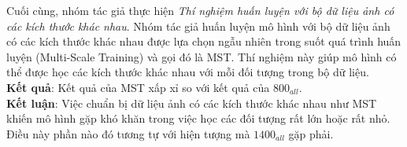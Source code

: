 {    \noindent
    Cuối cùng, nhóm tác giả thực hiện \textit{Thí nghiệm huấn luyện với bộ dữ liệu ảnh có các kích thước khác nhau}.
    Nhóm tác giả huấn luyện mô hình với bộ dữ liệu ảnh có các kích thước khác nhau được lựa chọn ngẫu nhiên trong suốt quá trình huấn luyện (Multi-Scale Training) và gọi đó là MST.
    Thí nghiệm này giúp mô hình có thể được học các kích thước khác nhau với mỗi đối tượng trong bộ dữ liệu. \\
    \textbf{Kết quả}:
    Kết quả của MST xấp xỉ so với kết quả của ${800}_{all}$. \\
    \textbf{Kết luận}:
    Việc chuẩn bị dữ liệu ảnh có các kích thước khác nhau như MST khiến mô hình gặp khó khăn trong việc học các đối tượng rất lớn hoặc rất nhỏ.
    Điều này phần nào đó tương tự với hiện tượng mà ${1400}_{all}$ gặp phải.
}